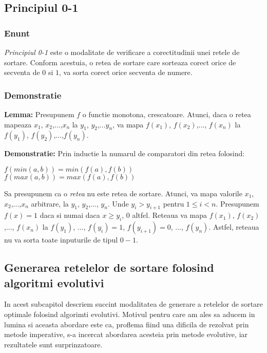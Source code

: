 \documentclass[12pt]{article}
\newenvironment{tightcenter}{%
  \setlength\topsep{0pt}
  \setlength\parskip{0pt}
  \begin{center}
}{%
  \end{center}
}
\begin{document}
\subsection{Principiul 0-1}

\subsubsection{Enunt}
\textit{Principiul 0-1} este o modalitate de verificare a corectitudinii unei retele de sortare. Conform acestuia, o retea de sortare care sorteaza corect orice de secventa de $0$ si $1$, va sorta corect orice secventa de numere.

\subsubsection{Demonstratie}

\textbf{Lemma:} Presupunem $f$ o functie monotona, crescatoare. Atunci, daca o retea mapeaza $x_1$, $x_2$,...,$x_n$ la $y_1$, $y_2$,...$y_n$, va mapa $f(x_1)$, $f(x_2)$,..., $f(x_n)$ la $f(y_1)$, $f(y_2)$,...,$f(y_n)$. 

\textbf{Demonstratie:} Prin inductie la numarul de comparatori din retea folosind:
\begin{tightcenter} 
 $f(min(a, b)) = min(f(a), f(b))$\\
 $f(max(a, b)) = max(f(a), f(b))$\\
\end{tightcenter}

Sa presupunem ca o \textit{retea} nu este retea de sortare. Atunci, va mapa valorile $x_1$, $x_2$,...,$x_n$ arbitrare, la $y_1$, $y_2$,..., $y_n$. Unde $y_i > y_{i+1}$ pentru $1 \leq i  < n$. Presupunem $f(x) = 1$ daca si numai daca $x \geq y_i$, $0$ altfel. Reteaua va mapa $f(x_1)$, $f(x_2)$,..., $f(x_n)$ la $f(y_1)$, ..., $f(y_i)=1$, $f(y_{i+1})=0$, ..., $f(y_n)$. Astfel, reteaua nu va sorta toate inputurile de tipul $0-1$.



\subsection{Generarea retelelor de sortare folosind algoritmi evolutivi}

In acest subcapitol descriem succint modalitatea de generare a retelelor de sortare optimale folosind algorimti evolutivi. Motivul pentru care am ales sa aducem in lumina si aceasta abordare este ca, proflema fiind una dificila de rezolvat prin metode imperative, s-a incercat abordarea acesteia prin metode evolutive, iar rezultatele sunt surprinzatoare.
\end{document}
